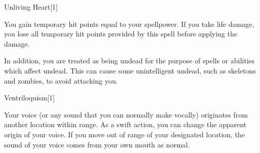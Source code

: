 \begin{spellsection}{Unliving Heart}[1]
    \begin{spellheader}
    \end{spellheader}
    \begin{spellcontent}
        \begin{spelltargetinginfo}
        \end{spelltargetinginfo}
        \begin{spelleffects}
            \spelleffect You gain temporary hit points equal to your spellpower. If you take life damage, you lose all temporary hit points provided by this spell before applying the damage.

            In addition, you are treated as being undead for the purpose of spells or abilities which affect undead. This can cause some unintelligent undead, such as skeletons and zombies, to avoid attacking you.
            \spelldur \durlong
        \end{spelleffects}
    \end{spellcontent}
    \begin{spellfooter}
        \miscastexplode
    \end{spellfooter}
\end{spellsection}

\begin{spellsection}{Ventriloquism}[1]
    \begin{spellheader}
    \end{spellheader}
    \begin{spellcontent}
        \begin{spelltargetinginfo}
            \spellrng{\rngmed}
        \end{spelltargetinginfo}
        \begin{spelleffects}
            \spelleffect Your voice (or any sound that you can normally make vocally) originates from another location within range. As a swift action, you can change the apparent origin of your voice. If you move out of range of your designated location, the sound of your voice comes from your own mouth as normal.
            \spelldur \durshort \dismissable
        \end{spelleffects}
    \end{spellcontent}
    \begin{spellfooter}
        \miscastexplode
    \end{spellfooter}
\end{spellsection}

